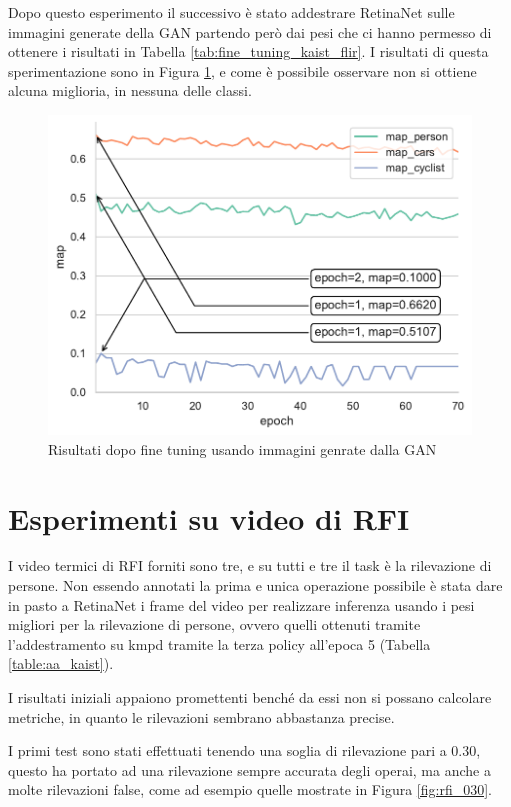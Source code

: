 Dopo questo esperimento il successivo è stato addestrare RetinaNet sulle immagini generate della \ac{GAN} partendo però dai pesi che ci hanno permesso di ottenere i risultati in Tabella \ref{tab:fine_tuning_kaist_flir}. I risultati di questa sperimentazione sono in Figura \ref{fig:fine_tuning_gan}, e come è possibile osservare non si ottiene alcuna miglioria, in nessuna delle classi. 
\begin{figure}[]
    \centering
    \includegraphics[width=\textwidth]{images/graphic/graphics_GAN.pdf}
    \caption{Risultati dopo fine tuning usando immagini genrate dalla GAN}
    \label{fig:fine_tuning_gan}
\end{figure}

\section{Esperimenti su video di RFI}
\label{sec:RFI_video_experiment}

I video termici di \ac{RFI} forniti sono tre, e su tutti e tre il task è la rilevazione di persone. Non essendo annotati la prima e unica operazione possibile è stata dare in pasto a RetinaNet i frame del video per realizzare inferenza usando i pesi migliori per la rilevazione di persone, ovvero quelli ottenuti tramite l'addestramento su \ac{kmpd} tramite la terza policy all'epoca 5 (Tabella \ref{table:aa_kaist}). 

I risultati iniziali appaiono promettenti benché da essi non si possano calcolare metriche, in quanto le rilevazioni sembrano abbastanza precise. 

I primi test sono stati effettuati tenendo una soglia di rilevazione pari a $0.30$, questo ha portato ad una rilevazione sempre accurata degli operai, ma anche a molte rilevazioni false, come ad esempio quelle mostrate in Figura \ref{fig:rfi_030}. 


